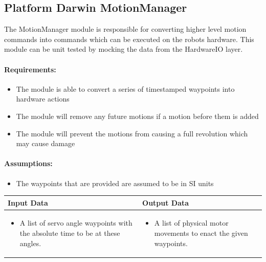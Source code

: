 \documentclass[english,12pt]{scrartcl}
\begin{document}
	\subsection{Platform Darwin MotionManager}
		The MotionManager module is responsible for converting higher level motion commands into commands which can be executed on the robots hardware.
		This module can be unit tested by mocking the data from the HardwareIO layer.
		
		\paragraph{Requirements:}
		\begin{itemize}
			\item The module is able to convert a series of timestamped waypoints into hardware actions
			\item The module will remove any future motions if a motion before them is added
			\item The module will prevent the motions from causing a full revolution which may cause damage
		\end{itemize}
		
		\paragraph{Assumptions:}
		\begin{itemize}
			\item The waypoints that are provided are assumed to be in SI units
		\end{itemize}
		
		\begin{tabular}{p{7cm}|p{7cm}}
			\textbf{Input Data} & \textbf{Output Data} \\ \hline
			\begin{itemize}
				\item A list of servo angle waypoints with the absolute time to be at these angles.
			\end{itemize}
			&
			\begin{itemize}
				\item A list of physical motor movements to enact the given waypoints.
			\end{itemize}
		\end{tabular}
\end{document}
